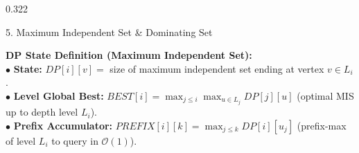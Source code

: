 \documentclass[final,17pt]{beamer}
\begin{document}
\begin{frame}[t]
\begin{columns}[t]
\begin{column}{0.322\textwidth}
\begin{posterbox}{5. Maximum Independent Set \& Dominating Set}
        \vspace{2pt}
        \begin{subbox}
            \textbf{DP State Definition (Maximum Independent Set):}\\[1.5pt]
            {\fontsize{8.0}{9.8}\selectfont
            $\bullet$ \textbf{State:} $DP[i][v] = $ size of maximum independent set ending at vertex $v \in L_i$.\\
            $\bullet$ \textbf{Level Global Best:} $BEST[i] = \max_{j \le i} \max_{u \in L_j} DP[j][u]$ (optimal MIS up to depth level $L_i$).\\
            $\bullet$ \textbf{Prefix Accumulator:} $PREFIX[i][k] = \max_{j \le k} DP[i][u_j]$ (prefix-max of level $L_i$ to query in $\mathcal{O}(1)$).
            }
        \end{subbox}


\end{posterbox}
\end{column}
\end{columns}
\end{frame}
\end{document}
